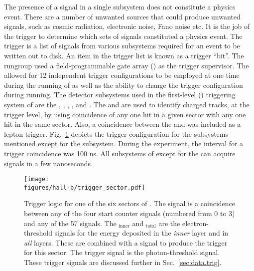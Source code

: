 The presence of a signal in a single subsystem does not constitute a physics event. There are a number of unwanted sources that could produce unwanted signals, such as cosmic radiation, electronic noise, Fano noise etc. It is the job of the trigger to determine which sets of signals constituted a physics event. The trigger is a list of signals from various subsystems required for an event to be written out to disk. An item in the trigger list is known as a trigger ``bit''. The  rungroup used a field-programmable gate array () as the trigger supervisor. The  allowed for 12 independent trigger configurations to be employed at one time during the running of  as well as the ability to change the trigger configuration during running. The detector subsystems used in the first-level () triggering system of  are the , ,  , , and . The  and  are used to identify charged tracks, at the trigger level, by using coincidence of any one  hit in a given sector with any one  hit in the same sector. Also, a coincidence between the  and  was included as a lepton trigger. Fig.~\ref{fig:clas.daq.trigsec} depicts the  trigger configuration for the subsystems mentioned except for the  subsystem. During the  experiment, the interval for a trigger coincidence was 100 ns. All subsystems of \clas except for the  can acquire signals in a few nanoseconds.
\begin{figure}[h]\begin{center}
\texttt{[image: \\figures/hall-b/trigger\_sector.pdf]}
\caption[Trigger logic for one of the six sectors of ]{\label{fig:clas.daq.trigsec}{}Trigger logic for one of the six sectors of . The  signal is a coincidence between any of the four start counter  signals (numbered from 0 to 3) and any of the 57   signals. The $_\mathrm{inner}$ and $_{\mathrm{total}}$ are the electron-threshold  signals for the energy deposited in the \emph{inner} layer and in \emph{all} layers. These are combined with a  signal to produce the  trigger for this sector. The  trigger signal is the photon-threshold  signal. These trigger signals are discussed further in Sec.~\ref{sec:data.trig}.}
\end{center}\end{figure}

